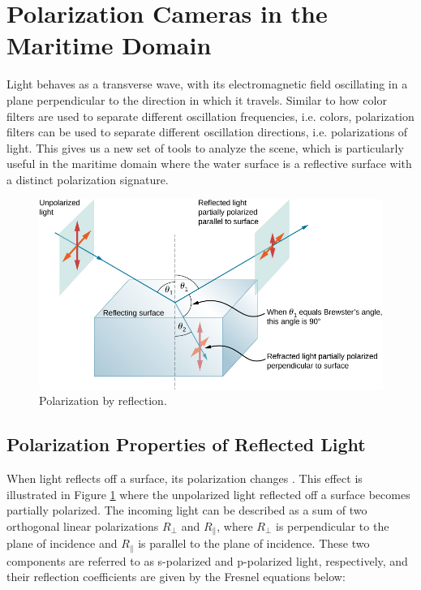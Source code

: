 \section{Polarization Cameras in the Maritime Domain}
Light behaves as a transverse wave, with its electromagnetic field oscillating in a plane perpendicular to the direction in which it travels.
Similar to how color filters are used to separate different oscillation frequencies, i.e. colors, polarization filters can be used to separate different oscillation directions, i.e. polarizations of light.
This gives us a new set of tools to analyze the scene, which is particularly useful in the maritime domain where the water surface is a reflective surface with a distinct polarization signature.

\begin{figure}[H]
    \centering
    \includegraphics[width=.8\linewidth]{figures/polarization/reflaction.png}
    \caption{Polarization by reflection.
        \cite[Figure 1.38]{lingUniversityPhysicsVolume2016}}
    \label{fig:polarized_reflection}
\end{figure}

\subsection{Polarization Properties of Reflected Light}
When light reflects off a surface, its polarization changes \cite[34]{lingUniversityPhysicsVolume2016}.
This effect is illustrated in Figure \ref{fig:polarized_reflection} where the unpolarized light reflected off a surface becomes partially polarized.
The incoming light can be described as a sum of two orthogonal linear polarizations $R_\perp$ and $R_\parallel$, where $R_\perp$ is perpendicular to the plane of incidence and $R_\parallel$ is parallel to the plane of incidence.
These two components are referred to as s-polarized and p-polarized light, respectively, and their reflection coefficients are given by the Fresnel equations below:

